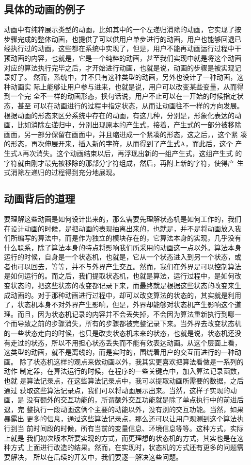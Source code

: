 \subsection{具体的动画的例子}
动画中有纯粹展示类型的动画，比如其中的一个左递归消除的动画，它实现了按
步骤完成的整体动画，也提供了可以供用户单步进行的动画，用户也能够回退已
经执行过的动画，这些都在系统中实现了，但是，用户不能再动画运行过程中干
预动画的内容，也就是，它是一个纯粹的动画，甚至我们实现中就是将这个动画
对应的算法执行完毕之后，才开始进行动画，也就是说，动画的步骤是被实现记
录好了。
然而，系统中，并不只有这种类型的动画，另外也设计了一种动画，这种动画实
际上能够让用户参与进来，也就是说，用户可以改变某些变量，从而得到一个完
全不一样的动画形态，换句话说，用户不止可以在一开始的时候指定状态，甚至
可以在动画进行的过程中指定状态，从而让动画往不一样的方向发展。
根据动画的形态来区分系统中存在的动画，有这几种，分别是，形象化表达的动
画，比如消除左递归中，分别出现原本的产生式，接着，产生式的一部分被移除
画面，另一部分保留在画面中，并且缩进成一个紧凑的形态，这之后，，这个紧
凑的形态，再次伸展开来，插入新的字符，从而得到了产生式A，而此后，这个
产生式A再次消失。这个动画结束以后，再浮现出新的一组产生式，这组产生式
的字符就由刚才最先被移除的那部分字符组成，然后，再附上新的字符，使得产
生式消除左递归的过程得到充分地展现。
\subsection{动画背后的道理}
要理解这些动画是如何设计出来的，那么需要先理解状态机是如何工作的，我们
在设计动画的时候，是把动画的表现抽离出来的，也就是，并不是将动画放入我
们所编写的算法中，而是作为独立的模块存在的，它算法本身的实现，几乎没有
什么联系，除了算法本身的特点将影响我们所采用的动画这一点以外。算法本身
运行的时候，自身是一个状态机，也就是，它从一个状态进入到另一个状态，或
者也可以回去，等等，并不与外界产生交互。然而，我们在外界是可以控制算法
是如何运行的。而之后，我们提取状态机，也就是算法，运行过程中，是如何改
变状态的，把这些状态的改变都记录下来，而最终就是根据这些状态的改变来生
成动画的。对于那种动画进行过程中，却可以改变算法的状态的，其实就是利用
了，状态机本身不对外界产生影响，但是，外界却能够对状态机产生影响这个道
理。而且，因为状态机记录的内容并不会丢失掉，不会因为算法重新执行到哪一
个而导致之前的步骤消失，所有的步骤都被完整记录下来。当外界去改变状态机
的一些状态走向的时候，也只是改变状态机未来的状态，也就是说，状态机还没
有走过的状态，所以不用担心状态丢失而不能有效表达动画。从这个层面上看，
这类型的动画，就不是离线的，而是实时的，围绕着用户的交互而进行的一种动
画。
除了状态机这样的观点来做动画以外，我其实更喜欢把算法看做是一系列的动作
制定器，在算法运行的时候，在程序的一些关键点中，加入算法记录函数，也就
是算法记录点，在这些算法记录点中，我可以提取动画所需要的数据，之后通过
获取这些算法记录点，我们可以将动画展示出来。当然，这样子实现的动画，是
没有额外的交互功能的，所谓额外交互功能就是除了单点执行中的前进后退，完
整执行一段动画这俩个主要的动能以外，没有别的交互功能。当然，如果暴露出
更多的信息，通过这些算法记录点，那么还可以让用户观测到这个算法执行到当
前时间段的时候，所有当前的变量信息、环境信息等等。这种方式，实际上就是
我们初次版本所要实现的方式，而更理想的状态机的方式，其实也是在这种方式
上面进行改造的结果。然而，在实现时，状态机的方式还有更多的问题需要解决，
所以在后续的开发中，我们要逐一解决这些问题。
